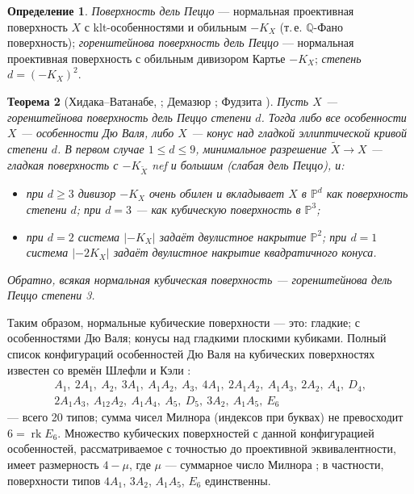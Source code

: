 \documentclass[11pt,a4paper]{article}
\theoremstyle{plain}
\newtheorem{theorem}{Теорема}[section]
\theoremstyle{definition}
\newtheorem{definition}[theorem]{Определение}
\theoremstyle{remark}
\newcommand{\Q}{\mathbb{Q}}
\newcommand{\PP}{\mathbb{P}}
\DeclareMathOperator{\rk}{rk}
\begin{document}
\begin{definition}
\emph{Поверхность дель Пеццо} --- нормальная проективная поверхность $X$ с klt-особенностями и
обильным $-K_X$ (т.\,е. $\Q$-Фано поверхность); \emph{горенштейнова поверхность дель Пеццо} ---
нормальная проективная поверхность с обильным дивизором Картье $-K_X$; \emph{степень}
$d=(-K_X)^2$.
\end{definition}

\begin{theorem}[{Хидака--Ватанабе, \cite{HW}; Демазюр \cite{De}; Фудзита \cite{Fuj90}}]\label{thm:Gor-dP}
Пусть $X$ --- горенштейнова поверхность дель Пеццо степени $d$. Тогда либо все особенности $X$ ---
особенности Дю Валя, либо $X$ --- конус над гладкой эллиптической кривой степени $d$. В первом
случае $1\le d\le9$, минимальное разрешение $\tilde X\to X$ --- гладкая поверхность с
$-K_{\tilde X}$ nef и большим (слабая дель Пеццо), и:
\begin{itemize}
\item при $d\ge3$ дивизор $-K_X$ очень обилен и вкладывает $X$ в $\PP^d$ как поверхность
степени $d$; при $d=3$ --- как кубическую поверхность в $\PP^3$;
\item при $d=2$ система $|-K_X|$ задаёт двулистное накрытие $\PP^2$; при $d=1$ система $|-2K_X|$
задаёт двулистное накрытие квадратичного конуса.
\end{itemize}
Обратно, всякая нормальная кубическая поверхность --- горенштейнова дель Пеццо степени 3.
\end{theorem}

Таким образом, нормальные кубические поверхности --- это: гладкие; с особенностями Дю Валя;
конусы над гладкими плоскими кубиками. Полный список конфигураций особенностей Дю Валя на кубических
поверхностях известен со времён Шлефли и Кэли \cite{BW}:
\[
\begin{array}{l}
A_1,\ 2A_1,\ A_2,\ 3A_1,\ A_1A_2,\ A_3,\ 4A_1,\ 2A_1A_2,\ A_1A_3,\ 2A_2,\ A_4,\ D_4,\\
2A_1A_3,\ A_12A_2,\ A_1A_4,\ A_5,\ D_5,\ 3A_2,\ A_1A_5,\ E_6
\end{array}
\]
--- всего 20 типов; сумма чисел Милнора (индексов при буквах) не превосходит $6=\rk E_6$. Множество
кубических поверхностей с данной конфигурацией особенностей, рассматриваемое с точностью до
проективной эквивалентности, имеет размерность $4-\mu$, где $\mu$ --- суммарное число Милнора
\cite{BW}; в частности, поверхности типов $4A_1$, $3A_2$, $A_1A_5$, $E_6$ единственны.
\end{document}
